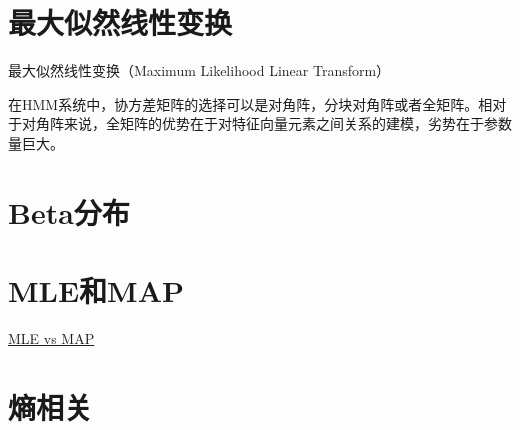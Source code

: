 \section{最大似然线性变换}
最大似然线性变换（Maximum Likelihood Linear Transform）

在HMM系统中，协方差矩阵的选择可以是对角阵，分块对角阵或者全矩阵。相对于对角阵来说，全矩阵的优势在于对特征向量元素之间关系的建模，劣势在于参数量巨大。

\section{Beta分布}
  
\section{MLE和MAP}

\href{https://wiseodd.github.io/techblog/2017/01/01/mle-vs-map/}{MLE vs MAP}

\section{熵相关}

